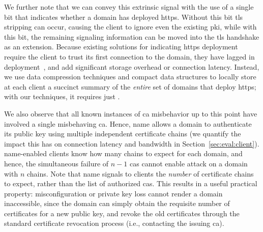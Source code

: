 We further note that we can convey this extrinsic signal with the use of a
single bit that indicates whether a domain has deployed \ac{https}. Without this
bit \ac{tls} stripping can occur, causing the client to ignore even the existing
\ac{pki}, while with this bit, the remaining signaling information can be moved
into the \ac{tls} handshake as an extension. Because existing solutions for
indicating \ac{https} deployment require the client to trust its first
connection to the domain, they have lagged in deployment~\cite{rfc4033,
rfc6698}, and add significant storage
overhead or connection
latency. Instead, we
use data compression techniques and compact data structures to locally store at
each client a succinct summary of the \emph{entire} set of domains that deploy
\ac{https}; with our techniques, it requires just .

We also observe that all known instances of \ac{ca} misbehavior up to this point
have involved a single misbehaving \ac{ca}.  Hence, \ac{name} allows
a domain to authenticate its public key using multiple independent certificate chains
(we quantify the impact this has on connection latency and bandwidth in Section~\ref{sec:eval:client}).
\ac{name}-enabled clients know how many chains to expect for each domain,
and hence, the simultaneous failure of $n-1$ \acp{ca} cannot enable  attack
on a domain with $n$ chains.
Note that \ac{name} signals to clients
the \emph{number} of certificate chains to expect, rather than the list of
authorized \acp{ca}.  This results in a useful practical property:
misconfiguration or private key loss cannot render a domain inaccessible, since
the domain can simply obtain the requisite number of certificates for a new
public key, and revoke the old certificates 
through the standard certificate revocation process (i.e., contacting the
issuing \ac{ca}).


